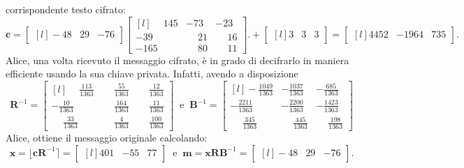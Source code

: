 \begin{exmp}
corrispondente testo cifrato:
\begin{equation*}
    \mathbf{c} =
    \begin{bmatrix*}[l]
        -48 & 29 & -76
    \end{bmatrix*}
    \begin{bmatrix*}[l]
        \phantom{-}145 & -73 & -23\\
        -39  & \phantom{-}21 & \phantom{-}16\\
        -165  & \phantom{-}80 & \phantom{-}11
    \end{bmatrix*}.
    +
    \begin{bmatrix*}[l]
        3 & 3 & 3
    \end{bmatrix*}
    =
    \begin{bmatrix*}[l]
        4452 & -1964 & 735
    \end{bmatrix*}.
\end{equation*}
Alice, una volta ricevuto il messaggio cifrato, è in grado di decifrarlo in maniera efficiente
usando la sua chiave privata. Infatti, avendo a disposizione
\[
    \mathbf{R}^{-1} = 
    \begin{bmatrix*}[l]
        \phantom{-}\frac{113}{1363} & \phantom{-}\frac{55}{1363} & \phantom{-}\frac{12}{1363}\\[6pt]
        -\frac{10}{1363}            & \phantom{-}\frac{164}{1363} & \phantom{-}\frac{11}{1363}\\[6pt]
        \phantom{-}\frac{33}{1363}  & \phantom{-}\frac{4}{1363}   & \phantom{-}\frac{100}{1363}
    \end{bmatrix*}
    \ \text{ e } \ 
    \mathbf{B}^{-1} = 
    \begin{bmatrix*}[l]
        -\frac{1049}{1363} & -\frac{1037}{1363} & -\frac{685}{1363}\\[6pt]
        -\frac{2211}{1363} & -\frac{2200}{1363} & -\frac{1423}{1363}\\[6pt]
        \phantom{-}\frac{345}{1363} & \phantom{-}\frac{445}{1363} & \phantom{-}\frac{198}{1363}
    \end{bmatrix*}
\]
Alice, ottiene il messaggio originale calcolando:
\[
    \mathbf{x} = \lfloor \mathbf{c}\mathbf{R}^{-1}\rceil = 
    \begin{bmatrix*}[l]
        401 & -55 & 77 
    \end{bmatrix*}
    \ \text{ e } \ \mathbf{m} = \mathbf{x}\mathbf{R}\mathbf{B}^{-1} = 
    \begin{bmatrix*}[l]
        -48 & 29 & -76
    \end{bmatrix*}.
\]
\end{exmp}
